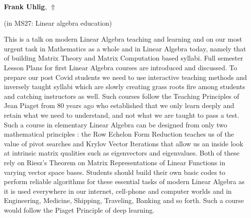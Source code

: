 \documentclass[ILAS2025-program.tex]{subfiles}
\begin{document}
\hypertarget{down0260}{}\begin{ilasabstract}
    
\textbf{Frank Uhlig},  \hfill \hyperlink{up0260}{$\Uparrow$}
    
    
(in {\color{mstitle}MS27: Linear algebra education})
        
\mtskip
    This is a talk on modern Linear Algebra teaching and learning and on our most urgent task in Mathematics as a whole and in Linear Algebra today, namely that   of building Matrix Theory and Matrix Computation based syllabi. Full semester Lesson Plans for first Linear Algebra courses are introduced and discussed. To prepare our post Covid students we need to use interactive teaching methods and inversely taught syllabi which are slowly creating  grass roots fire among students and catching instructors as well. Such courses follow the Teaching Principles of Jean Piaget from 80 years ago who established that we only learn deeply and retain what we need to understand, and not what we are taught to pass a test. Such a course in elementary Linear Algebra can be designed from only two mathematical  principles : the Row Echelon Form Reduction teaches us of the value of pivot searches and  Krylov Vector Iterations that allow us an inside look at intrinsic matrix qualities such as eigenvectors and eigenvalues. Both of these rely on Riesz's Theorem on Matrix Representations of Linear Functions in varying vector space bases. Students should build their own basic codes to perform reliable algorithms for these essential tasks of modern Linear Algebra as it is used everywhere in our internet, cell-phone and computer worlds and in Engineering, Medicine, Shipping, Traveling, Banking and so forth.
Such a course would follow the Piaget Principle of deep learning.



\end{ilasabstract}
    
\end{document}
